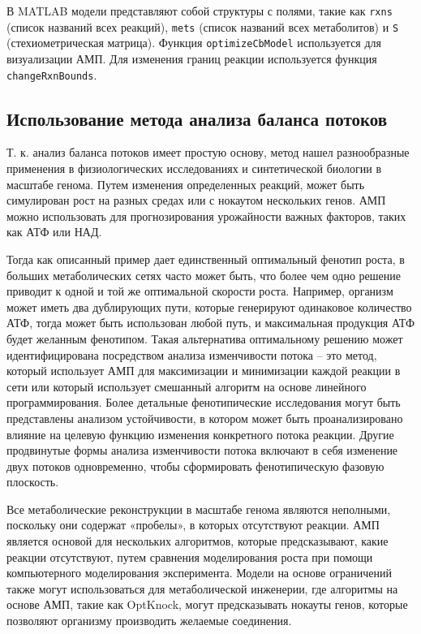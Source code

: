 \documentclass[a4paper, 12pt]{article}
\begin{document}
В MATLAB модели представляют собой структуры с полями, такие как \texttt{rxns} (список названий всех реакций), \texttt{mets} (список названий всех метаболитов) и \texttt{S} (стехиометрическая матрица). Функция \texttt{optimizeCbModel} используется для визуализации АМП. Для изменения границ реакции используется функция \texttt{changeRxnBounds}.  


\subsection{Использование метода анализа баланса потоков}

Т. к. анализ баланса потоков имеет простую основу, метод нашел разнообразные применения в физиологических исследованиях и синтетической биологии в масштабе генома. Путем изменения определенных реакций, может быть симулирован рост на разных средах или с нокаутом нескольких генов. АМП можно использовать для прогнозирования урожайности важных факторов, таких как АТФ или НАД.

Тогда как описанный пример дает единственный оптимальный фенотип роста, в больших метаболических сетях часто может быть, что более чем одно решение приводит к одной и той же оптимальной скорости роста. Например, организм может иметь два дублирующих пути, которые генерируют одинаковое количество АТФ, тогда может быть использован любой путь, и максимальная продукция АТФ будет желанным фенотипом. Такая альтернатива оптимальному решению может идентифицирована посредством анализа изменчивости потока – это метод, который использует АМП для максимизации и минимизации каждой реакции в сети или который использует смешанный алгоритм на основе линейного программирования. Более детальные фенотипические исследования могут быть представлены анализом устойчивости, в котором может быть проанализировано влияние на целевую функцию изменения конкретного потока реакции. Другие продвинутые формы анализа изменчивости потока включают в себя изменение двух потоков одновременно, чтобы сформировать фенотипическую фазовую плоскость.

Все метаболические реконструкции в масштабе генома являются неполными, поскольку они содержат «пробелы», в которых отсутствуют реакции. АМП является основой для нескольких алгоритмов, которые предсказывают, какие реакции отсутствуют, путем сравнения моделирования роста при помощи компьютерного моделирования эксперимента. Модели на основе ограничений также могут использоваться для метаболической инженерии, где алгоритмы на основе АМП, такие как OptKnock, могут предсказывать нокауты генов, которые позволяют организму производить желаемые соединения.
\end{document}
